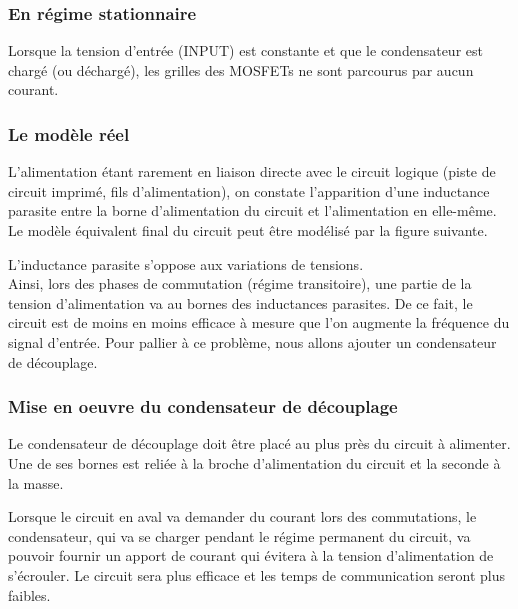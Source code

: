 \subsubsection{En régime stationnaire}

Lorsque la tension d'entrée (INPUT) est constante et que le condensateur est chargé (ou déchargé), les grilles des MOSFETs ne sont parcourus par aucun courant.\\

\subsubsection{Le modèle réel}

L'alimentation étant rarement en liaison directe avec le circuit logique (piste de circuit imprimé, fils d'alimentation), on constate l'apparition d'une inductance parasite entre la borne d'alimentation du circuit et l'alimentation en elle-même.
Le modèle équivalent final du circuit peut être modélisé par la figure suivante.


L'inductance parasite s'oppose aux variations de tensions. \\ Ainsi, lors des phases de commutation (régime transitoire), une partie de la tension d'alimentation va au bornes des inductances parasites.
De ce fait, le circuit est de moins en moins efficace à mesure que l'on augmente la fréquence du signal d'entrée.
Pour pallier à ce problème, nous allons ajouter un condensateur de découplage.
\subsubsection{Mise en oeuvre du condensateur de découplage}


Le condensateur de découplage doit être placé au plus près du circuit à alimenter. Une de ses bornes est reliée à la broche d'alimentation du circuit et la seconde à la masse. \n


Lorsque le circuit en aval va demander du courant lors des commutations, le condensateur, qui va se charger pendant le régime permanent du circuit, va pouvoir fournir un apport de courant qui évitera à la tension d'alimentation de s'écrouler. 
Le circuit sera plus efficace et les temps de communication seront plus faibles. \\


